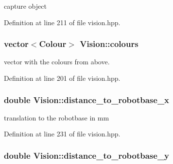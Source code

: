 capture object 



Definition at line 211 of file vision.\+hpp.

\subsubsection[{\texorpdfstring{colours}{colours}}]{\setlength{\rightskip}{0pt plus 5cm}vector$<${\bf Colour}$>$ Vision\+::colours\hspace{0.3cm}{\ttfamily [private]}}\hypertarget{class_vision_a6496f699a73a71319e02ed239c640478}{}\label{class_vision_a6496f699a73a71319e02ed239c640478}


vector with the colours from above. 



Definition at line 201 of file vision.\+hpp.

\subsubsection[{\texorpdfstring{distance\+\_\+to\+\_\+robotbase\+\_\+x}{distance_to_robotbase_x}}]{\setlength{\rightskip}{0pt plus 5cm}double Vision\+::distance\+\_\+to\+\_\+robotbase\+\_\+x\hspace{0.3cm}{\ttfamily [private]}}\hypertarget{class_vision_a313acf0b614275c6adfcda8e20040837}{}\label{class_vision_a313acf0b614275c6adfcda8e20040837}


translation to the robotbase in mm 



Definition at line 231 of file vision.\+hpp.

\subsubsection[{\texorpdfstring{distance\+\_\+to\+\_\+robotbase\+\_\+y}{distance_to_robotbase_y}}]{\setlength{\rightskip}{0pt plus 5cm}double Vision\+::distance\+\_\+to\+\_\+robotbase\+\_\+y\hspace{0.3cm}{\ttfamily [private]}}\hypertarget{class_vision_a2d250c93ba3590a87bb19113cf4d25c1}{}\label{class_vision_a2d250c93ba3590a87bb19113cf4d25c1}


